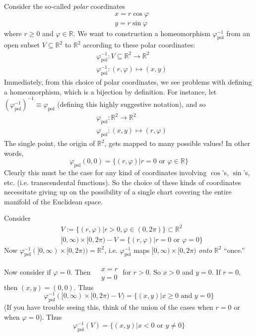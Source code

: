 \documentclass[10pt, twoside]{amsart}
\begin{document}
\begin{multicols*}{2}
Consider the so-called \emph{polar} coordinates 
\begin{equation}\label{Eq:R2polarcoordinates}
\begin{aligned}
  & x = r\cos{\varphi} \\ 
  & y = r\sin{\varphi}
\end{aligned}
\end{equation}
where $r\geq 0$ and $\varphi \in \mathbb{R}$.  We want to construction a homeomorphism $\varphi^{-1}_{\text{pol}}$ from an open subset $V \subseteq \mathbb{R}^2$ to $\mathbb{R}^2$ according to these polar coordinates:
\[
\begin{aligned}
  & \varphi_{\text{pol}}^{-1}: V \subseteq \mathbb{R}^2 \to \mathbb{R}^2 \\ 
  & \varphi^{-1}_{\text{pol}}:(r,\varphi) \mapsto (x,y)
\end{aligned}
\]
Immediately, from this choice of polar coordinates, we see problems with defining a homeomorphism, which is a bijection by definition.  For instance, let $(\varphi_{\text{pol}}^{-1})^{-1} \equiv \varphi_{\text{pol}}$ (defining this highly suggestive notation), and so 
\[
\begin{aligned}
  & \varphi_{\text{pol}}:\mathbb{R}^2 \to \mathbb{R}^2 \\ 
  & \varphi_{\text{pol}}:(x,y) \mapsto (r,\varphi)
\end{aligned}
\]
The single point, the origin of $\mathbb{R}^2$, gets mapped to many possible values! In other words,
\[
\varphi_{\text{pol}}(0,0) = \lbrace (r,\varphi) | r=0 \text{ or } \varphi \in \mathbb{R} \rbrace
\]
Clearly this must be the case for any kind of coordinates involving $\cos$'s, $\sin$'s, etc. (i.e. transcendental functions).  So the choice of these kinds of coordinates necessitate giving up on the possibility of a single chart covering the entire manifold of the Euclidean space.  

Consider 
\[
\begin{aligned}
  & V := \lbrace (r,\varphi) | r>0, \varphi \in (0,2\pi) \rbrace \subset \mathbb{R}^2 \\ 
  & [0,\infty) \times [0,2\pi ) - V = \lbrace (r,\varphi) | r = 0 \text{ or } \varphi = 0 \rbrace
\end{aligned}
\]
Now $\varphi_{\text{pol}}^{-1}( [0,\infty) \times [0,2\pi)) = \mathbb{R}^2$, i.e. $\varphi_{\text{pol}}^{-1}$ maps $[0,\infty) \times [0,2\pi)$ \emph{onto} $\mathbb{R}^2$ ``once.''  

Now consider if $\varphi=0$.  Then $\begin{aligned} & \quad \\
  & x = r \\ 
  & y = 0 \end{aligned}$ for $r>0$.  So $x>0$ and $y=0$.  If $r=0$, then $(x,y)=(0,0)$.  Thus
\[
\varphi_{\text{pol}}^{-1}( [0,\infty) \times [0,2\pi)-V) = \lbrace (x,y) | x\geq 0 \text{ and } y=0 \rbrace
\]
(If you have trouble seeing this, think of the union of the cases when $r=0$ or when $\varphi=0$).  Thus
\[
\varphi^{-1}_{\text{pol}}(V) = \lbrace (x,y) | x<0 \text{ or } y \neq 0 \rbrace
\]


\end{multicols*}
\end{document}
